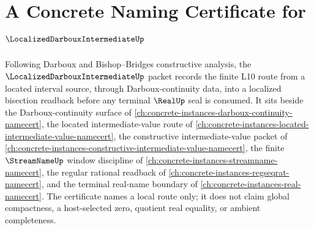 \chapter{A Concrete Naming Certificate for $\LocalizedDarbouxIntermediateUp$}
\label{ch:concrete-instances-localized-darboux-intermediate-namecert}

Following Darboux and Bishop--Bridges constructive analysis, the $\LocalizedDarbouxIntermediateUp$ packet records the finite L10 route from a located interval source, through Darboux-continuity data, into a localized bisection readback before any terminal $\RealUp$ seal is consumed. It sits beside the Darboux-continuity surface of \autoref{ch:concrete-instances-darboux-continuity-namecert}, the located intermediate-value route of \autoref{ch:concrete-instances-located-intermediate-value-namecert}, the constructive intermediate-value packet of \autoref{ch:concrete-instances-constructive-intermediate-value-namecert}, the finite $\StreamNameUp$ window discipline of \autoref{ch:concrete-instances-streamname-namecert}, the regular rational readback of \autoref{ch:concrete-instances-regseqrat-namecert}, and the terminal real-name boundary of \autoref{ch:concrete-instances-real-namecert}. The certificate names a local route only; it does not claim global compactness, a host-selected zero, quotient real equality, or ambient completeness.


